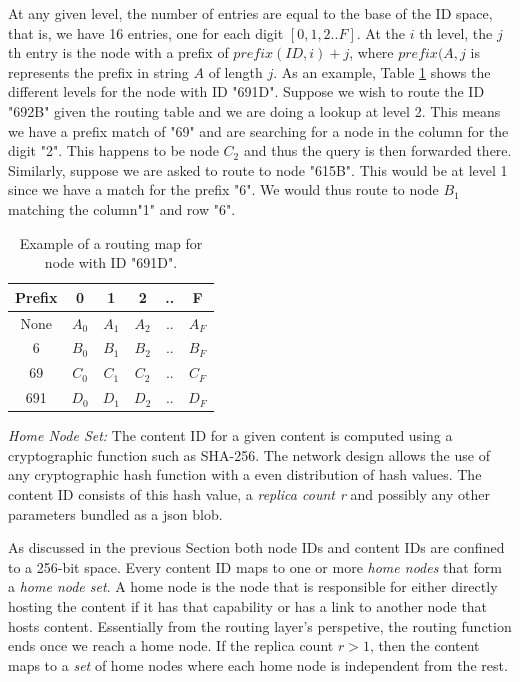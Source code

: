 At any given level, the number of entries are equal to the base of the ID space, that is, we have 16 entries, one for
each digit \( [ 0, 1, 2..F ] \). At the \(i\) th level, the \( j\)th entry is the node with a prefix of \( prefix(ID, i)
+ j\), where \(prefix(A,j\) is represents the prefix in string \(A\) of length \(j\). As an example, Table
\ref{table:routing_map} shows the different levels for the node with ID "691D".  Suppose we wish to route the ID "692B"
given the routing table and we are doing a lookup at level 2. This means we have a prefix match of "69" and are
searching for a node in the column for the digit "2". This happens to be node \(C_2\) and thus the query is then
forwarded there. Similarly, suppose we are asked to route to node "615B". This would be at level 1 since we have a match
for the prefix "6". We would thus route to node \(B_1\) matching the column"1" and row "6".

\begin{table}[h]
\begin{center}
    \renewcommand{\arraystretch}{1.5}
\begin{tabular} {| c | c | c | c | c | c |}
    \hline
    Prefix & 0 & 1 & 2 & .. & F \\
    \hline
    \hline
    None & \(A_0\) & \(A_1\) & \(A_2\) & .. & \(A_F\) \\
    6 & \(B_0\) & \(B_1\) & \(B_2\) & .. & \(B_F\) \\
    69 & \(C_0\) & \(C_1\) & \(C_2\) & .. & \(C_F\) \\
    691 & \(D_0\) & \(D_1\) & \(D_2\) & .. & \(D_F\) \\
    \hline
\end{tabular}
\label{table:routing_map}
\caption{Example of a routing map for node with ID "691D".}
\end{center}
\end{table}

{\em Home Node Set:} The content ID for a given content is computed using a cryptographic function such as SHA-256. The
network design allows the use of any cryptographic hash function with a even distribution of hash values. The content ID 
consists of this hash value, a {\em replica count r} and possibly any other parameters bundled as a json blob.

As discussed in the previous Section both node IDs and content IDs are confined to a 256-bit space.  Every content ID
maps to one or more {\em home nodes} that form a {\em home node set}. A home node is the node that is responsible for
either directly hosting the content if it has that capability or has a link to another node that hosts content.
Essentially from the routing layer's perspetive, the routing function ends once we reach a home node. If the replica
count \( r > 1\), then the content maps to a {\em set} of home nodes where each home node is independent from the rest.

